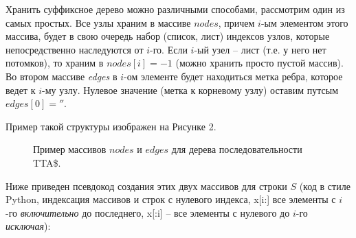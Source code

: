 \documentclass[letterpaper, 11pt]{article}
\begin{document}
Хранить суффиксное дерево можно различными способами, рассмотрим один из самых простых. Все узлы храним в массиве $nodes$, причем $i$-ым элементом этого массива, будет в свою очередь набор (список, лист) индексов узлов, которые непосредственно наследуются от $i$-го. Если $i$-ый узел -- лист (т.е. у него нет потомков), то храним в $nodes[i] = -1$ (можно хранить просто пустой массив). Во втором массиве \textit{edges} в $i$-ом элементе будет находиться метка ребра, которое ведет к $i$-му узлу. Нулевое значение (метка к корневому узлу) оставим путсым $edges[0] = ''$.

Пример такой структуры изображен на Рисунке 2.

\begin{figure}[H]
  \caption{Пример массивов $nodes$ и $edges$ для дерева последовательности TTA\$.}
\end{figure}

Ниже приведен псевдокод создания этих двух массивов для строки $S$ (код в стиле Python, индексация массивов и строк с нулевого индекса, x[i:] все элементы с $i$-го \textit{включительно} до последнего, x[:i] -- все элементы с нулевого до $i$-го \textit{исключая}):
\end{document}
